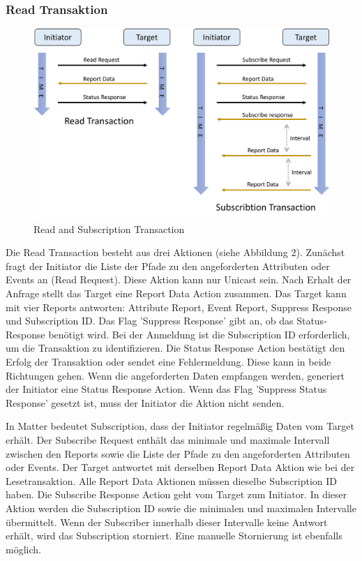\documentclass[12pt, a4paper]{article}
\begin{document}
\subsubsection{Read Transaktion}
\begin{figure}[h]
  \centering
  \includegraphics[scale=0.5]{read}
  \caption{Read and Subscription Transaction}
  \label{Read and Subscription Transaction}
\end{figure}
\par Die Read Transaction besteht aus drei Aktionen (siehe Abbildung 2). Zunächst fragt der Initiator die Liste der Pfade zu den angeforderten Attributen oder Events an (Read Request). Diese Aktion kann nur Unicast sein. Nach Erhalt der Anfrage stellt das Target eine Report Data Action zusammen.  Das Target kann mit vier Reports antworten: Attribute Report, Event Report, Suppress Response und Subscription ID. Das Flag 'Suppress Response' gibt an, ob das Status-Response benötigt wird. Bei der Anmeldung ist die Subscription ID erforderlich, um die Transaktion zu identifizieren. Die Status Response Action bestätigt den Erfolg der Transaktion oder sendet eine Fehlermeldung. Diese kann in beide Richtungen gehen. Wenn die angeforderten Daten empfangen werden, generiert der Initiator eine Status Response Action. Wenn das Flag 'Suppress Status Response' gesetzt ist, muss der Initiator die Aktion nicht senden.
\par In Matter bedeutet Subscription, dass der Initiator regelmäßig Daten vom Target erhält. Der Subscribe Request enthält das minimale und maximale Intervall zwischen den Reports sowie die Liste der Pfade zu den angeforderten Attributen oder Events. Der Target antwortet mit derselben Report Data Aktion wie bei der Lesetransaktion. Alle Report Data Aktionen müssen dieselbe Subscription ID haben. Die Subscribe Response Action geht vom Target zum Initiator. In dieser Aktion werden die Subscription ID sowie die minimalen und maximalen Intervalle übermittelt. Wenn der Subscriber innerhalb dieser Intervalle keine Antwort erhält, wird das Subscription storniert. Eine manuelle Stornierung ist ebenfalls möglich.
\end{document}
